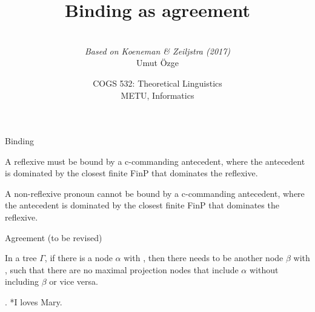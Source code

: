 \documentclass[ignorenonframetext,10pt,aspectratio=169]{beamer}
\title{Binding as agreement}
\author{\  \\  {\it Based on Koeneman \& Zeiljstra (2017)} \\ \vspace{20pt} Umut \"Ozge\\  }
\date{COGS 532: Theoretical Linguistics\\ METU, Informatics}
\begin{document}
\begin{frame}\frametitle{}
\thispagestyle{empty}
\maketitle
\end{frame}

\begin{frame}[t,plain]{Binding}
		\bigskip


		A reflexive must be bound by a c-commanding antecedent, where the  antecedent is dominated by the closest finite FinP that dominates the reflexive.

		\bigskip


		A non-reflexive pronoun cannot be bound by a c-commanding antecedent, where the  antecedent is dominated by the closest finite FinP that dominates the reflexive.

\end{frame}

\begin{frame}[t,plain]{Agreement (to be revised)}

		\vspace{40pt}

In a tree $\Gamma$, if there is a node $\alpha$ with \setavm{\[F$^{(u)}$\]}, then there needs to be another node $\beta$ with \setavm{\[F\]}, such that there are no maximal projection nodes that include $\alpha$ without including $\beta$ or vice versa.
	

\end{frame}

\begin{frame}[t,plain]{}

		\ex. *I loves Mary.

\begin{center}
\end{center}
\end{frame}
\end{document}
